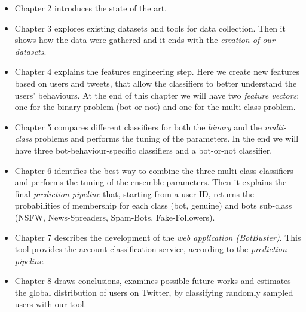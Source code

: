 \begin{itemize}
\item[\PencilRight] Chapter 2 introduces the state of the art.

\item[\PencilRight] Chapter 3 explores existing datasets and tools for data collection. Then it shows how the data were gathered and it ends with the \emph{creation of our datasets}.

\item[\PencilRight] Chapter 4 explains the features engineering step. Here we create new features based on users and tweets, that allow the classifiers to better understand the users' behaviours. At the end of this chapter we will have two \emph{feature vectors}: one for the binary problem (bot or not) and one for the multi-class problem.

\item[\PencilRight] Chapter 5 compares different classifiers for both the \emph{binary} and the \emph{multi-class} problems and performs the tuning of the parameters. In the end we will have three bot-behaviour-specific classifiers and a bot-or-not classifier.

\item[\PencilRight] Chapter 6 identifies the best way to combine the three multi-class classifiers and performs the tuning of the ensemble parameters. Then it explains the final \emph{prediction pipeline} that, starting from a user ID, returns the probabilities of membership for each class (bot, genuine) and bots sub-class (NSFW, News-Spreaders, Spam-Bots, Fake-Followers).

\item[\PencilRight] Chapter 7 describes the development of the \emph{web application (BotBuster)}. This tool provides the account classification service, according to the \emph{prediction pipeline}.

\item[\PencilRight] Chapter 8 draws conclusions, examines possible future works and estimates the global distribution of users on Twitter, by classifying randomly sampled users with our tool.


\end{itemize}

